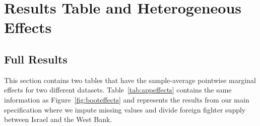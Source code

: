 \documentclass[12pt]{article}
\begin{document}
		
\newpage
\appendix
\setcounter{table}{0}
\renewcommand{\thetable}{A\arabic{table}}
\setcounter{figure}{0}
\renewcommand{\thefigure}{A\arabic{figure}}
\setcounter{equation}{0}
\renewcommand{\theequation}{\Alph{section}.\arabic{equation}}
\section{Results Table and Heterogeneous Effects}	\label{app:tables}

\subsection{Full Results}

This section contains two tables that have the sample-average pointwise marginal effects for two different datasets. Table~\ref{tab:appeffects} contains the same information as Figure~\ref{fig:booteffects} and represents the results from our main specification where we impute missing values and divide foreign fighter supply between Israel and the West Bank. \\
\end{document}
